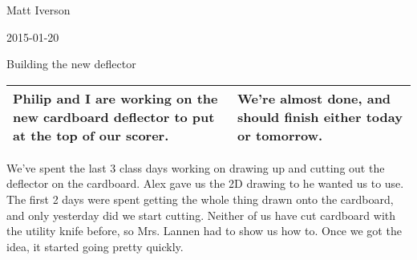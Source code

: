 Matt Iverson

2015-01-20

Building the new deflector

\begin{tabular}{|p{5cm}|p{5cm}|}
 \hline
 Philip and I are working on the new cardboard deflector to put at the top of our scorer.
&
 We're almost done, and should finish either today or tomorrow.
\\
 \hline
\end{tabular}

We've spent the last 3 class days working on drawing up and cutting out the deflector on the cardboard. Alex gave us the 2D drawing to he wanted us to use. The first 2 days were spent getting the whole thing drawn onto the cardboard, and only yesterday did we start cutting. Neither of us have cut cardboard with the utility knife before, so Mrs. Lannen had to show us how to. Once we got the idea, it started going pretty quickly.
